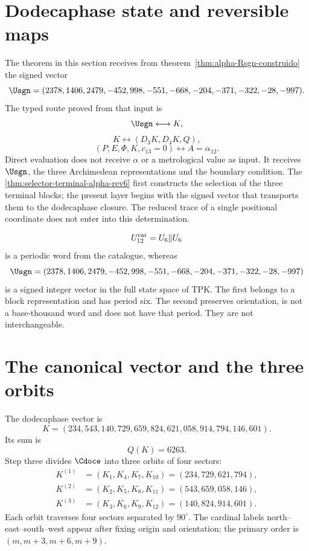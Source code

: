 \section{Dodecaphase state and reversible maps}

The theorem in this section receives from
theorem~\ref{thm:alpha-Rsgn-construido} the signed vector
\[
\Usgn=(2378,1406,2479,-452,998,-551,-668,-204,-371,-322,-28,-997).
\]
The typed route proved from that input is
\[
\Usgn\longleftrightarrow K,
\]
\[
K\longleftrightarrow(D_3K,D_4K,Q),
\]
\[
(P,E,\Phi,K,c_{13}=0)
\longleftrightarrow A=\alpha_{12}.
\]
Direct evaluation does not receive \(\alpha\) or a metrological value as
input. It receives \(\Usgn\), the three Archimedean representations and the
boundary condition. The
\cref{thm:selector-terminal-alpha-rev6} first constructs the selection of the
three terminal blocks; the present layer begins with the signed vector that
transports them to the dodecaphase closure. The reduced trace of a single
positional coordinate does not enter into this determination.

\begin{remark}
\[
U_{12}^{\rm cat}=U_6\Vert U_6
\]
is a periodic word from the catalogue, whereas
\[
\Usgn=(2378,1406,2479,-452,998,-551,-668,-204,-371,-322,-28,-997)
\]
is a signed integer vector in the full state space of TPK\@. The first belongs to a
block representation and has period six. The second preserves orientation, is not
a base-thousand word and does not have that period. They are not interchangeable.
\end{remark}

\section{The canonical vector and the three orbits}

The dodecaphase vector is
\[
\boxed{
K=(234,543,140,729,659,824,621,058,914,794,146,601).}
\]
Its sum is
\[
Q(K)=6263.
\]
Step three divides \(\Cdoce\) into three orbits of four sectors:
\[
\begin{aligned}
K^{(1)}&=(K_1,K_4,K_7,K_{10})=(234,729,621,794),\\
K^{(2)}&=(K_2,K_5,K_8,K_{11})=(543,659,058,146),\\
K^{(3)}&=(K_3,K_6,K_9,K_{12})=(140,824,914,601).
\end{aligned}
\]
Each orbit traverses four sectors separated by \(90^\circ\). The
cardinal labels north--east--south--west appear after fixing origin and orientation; the
primary order is \((m,m+3,m+6,m+9)\).

